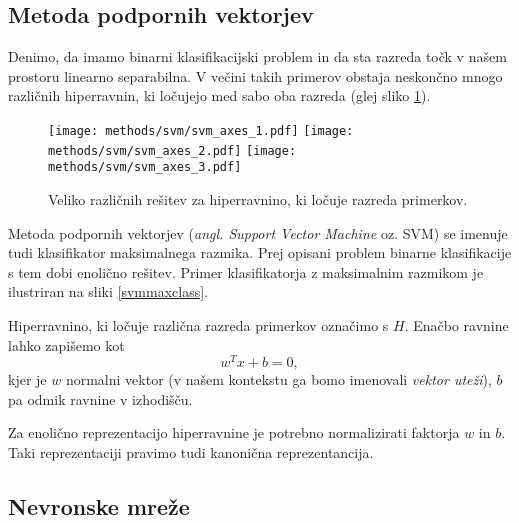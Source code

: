 \documentclass[11pt,a4paper,openany]{book}
\begin{document}
\subsection{Metoda podpornih vektorjev}

Denimo, da imamo binarni klasifikacijski problem in da sta razreda točk v našem prostoru linearno separabilna. V večini takih primerov obstaja neskončno mnogo različnih hiperravnin, ki ločujejo med sabo oba razreda (glej sliko \ref{svmseparable}).

\begin{figure}[ht]
	\texttt{[image: methods/svm/svm\_axes\_1.pdf]}
	\texttt{[image: methods/svm/svm\_axes\_2.pdf]}
	\texttt{[image: methods/svm/svm\_axes\_3.pdf]}	
	
	\caption{Veliko različnih rešitev za hiperravnino, ki ločuje razreda primerkov.}
	\label{svmseparable}
\end{figure}

Metoda podpornih vektorjev (\textit{angl. Support Vector Machine} oz. SVM) se imenuje tudi klasifikator maksimalnega razmika. Prej opisani problem binarne klasifikacije s tem dobi enolično rešitev. Primer klasifikatorja z maksimalnim razmikom je ilustriran na sliki \ref{svmmaxclass}.



Hiperravnino, ki ločuje različna razreda primerkov označimo s $H$. Enačbo ravnine lahko zapišemo kot
\begin{equation}
  w^T x + b = 0,
\end{equation}
kjer je $w$ normalni vektor (v našem kontekstu ga bomo imenovali \textit{vektor uteži}), $b$ pa odmik ravnine v izhodišču.

Za enolično reprezentacijo hiperravnine je potrebno normalizirati faktorja $w$ in $b$. Taki reprezentaciji pravimo tudi kanonična reprezentancija.


\subsection{Nevronske mreže}
\end{document}
